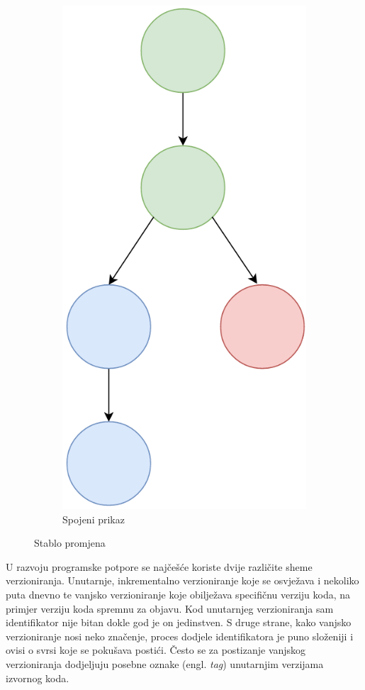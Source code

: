 \documentclass[times, utf8, diplomski, numeric]{fer}
\newcommand{\eng}[1]{(engl. \textit{#1})}
\begin{document}
\begin{figure}[h!]
\begin{subfigure}{.24\textwidth}
\includegraphics[scale=0.4]{VersioningTree}
\caption{Spojeni prikaz}
\label{fig:VersioningTreeD}
\end{subfigure}
\caption{Stablo promjena}
\label{fig:VersioningTree}
\end{figure}

U razvoju programske potpore se najčešće koriste dvije različite sheme verzioniranja. Unutarnje, inkrementalno verzioniranje koje se osvježava i nekoliko puta dnevno te vanjsko verzioniranje koje obilježava specifičnu verziju koda, na primjer verziju koda spremnu za objavu. Kod unutarnjeg verzioniranja sam identifikator nije bitan dokle god je on jedinstven. S druge strane, kako vanjsko verzioniranje nosi neko značenje, proces dodjele identifikatora je puno složeniji i ovisi o svrsi koje se pokušava postići. Često se za postizanje vanjskog verzioniranja dodjeljuju posebne oznake \eng{tag} unutarnjim verzijama izvornog koda.
\end{document}
